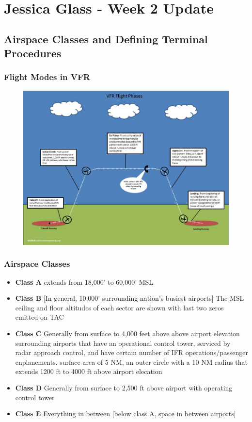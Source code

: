 \documentclass{article}
\begin{document}
\section{Jessica Glass - Week 2 Update}

\subsection{Airspace Classes and Defining Terminal Procedures}

\subsubsection*{Flight Modes in VFR}

\begin{figure}[H]
\centering
\includegraphics[scale=0.5]{VFR_flight_phases.jpg} 
\end{figure}

\subsubsection*{Airspace Classes}

\begin{itemize}
\item {\bf Class A} extends from 18,000' to 60,000' MSL
\item {\bf Class B} [In general, 10,000' surrounding nation's busiest airports] The MSL ceiling 
and floor altitudes of each sector are shown with last two zeros emitted on TAC
\item {\bf Class C} Generally from surface to 4,000 feet above above airport elevation surrounding
airports that have an operational control tower, serviced by radar approach control, and
have certain number of IFR operations/passenger enplanements.  surface area of 5 NM, an outer
circle with a 10 NM radius that extends 1200 ft to 4000 ft above airport elecation
\item {\bf Class D} Generally from surface to 2,500 ft above airport with operating control tower
\item {\bf Class E} Everything in between [below class A, space in between airports]

\end{itemize}
\end{document}

